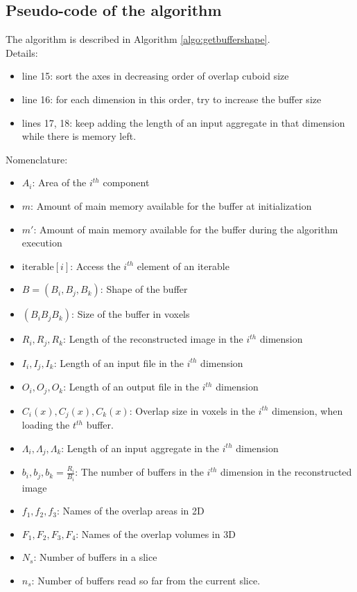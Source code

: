 \documentclass[conference]{IEEEtran}
\begin{document}
\subsection{Pseudo-code of the algorithm}
The algorithm is described in Algorithm \ref{algo:getbuffershape}. \\

Details:
\begin{itemize}
  \item line 15: sort the axes in decreasing order of overlap cuboid size
  \item line 16: for each dimension in this order, try to increase the buffer size
  \item lines 17, 18: keep adding the length of an input aggregate in that dimension while there is memory left.
\end{itemize}

Nomenclature:
\begin{itemize}
  \item $A_i$: Area of the $i^{th}$ component
  \item $m$: Amount of main memory available for the buffer at initialization
  \item $m'$: Amount of main memory available for the buffer during the algorithm execution
  \item $\textrm{iterable}[i]$: Access the $i^{th}$ element of an iterable
  \item $B = (B_i, B_j, B_k)$: Shape of the buffer
  \item $(B_i B_j B_k)$: Size of the buffer in voxels
  \item $R_i, R_j, R_k$: Length of the reconstructed image in the $i^{th}$ dimension
  \item $I_i, I_j, I_k$: Length of an input file in the $i^{th}$ dimension
  \item $O_i, O_j, O_k$: Length of an output file in the $i^{th}$ dimension
  \item $C_i(x), C_j(x), C_k(x)$: Overlap size in voxels in the $i^{th}$ dimension, when loading the $t^{th}$ buffer.
  \item $\Lambda_i, \Lambda_j, \Lambda_k$: Length of an input aggregate in the $i^{th}$ dimension
  \item $b_i, b_j, b_k = \frac{R_i}{B_i}$: The number of buffers in the $i^{th}$ dimension in the reconstructed image
  \item $f_1, f_2, f_3$: Names of the overlap areas in 2D
  \item $F_1, F_2, F_3, F_4$: Names of the overlap volumes in 3D
  \item $ N_s $: Number of buffers in a slice
  \item $ n_s $: Number of buffers read so far from the current slice.
\end{itemize}
\end{document}
